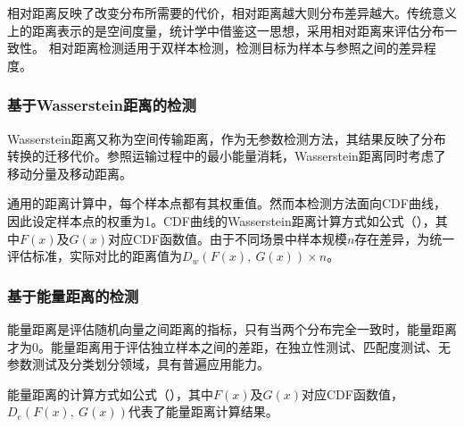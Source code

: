 相对距离反映了改变分布所需要的代价，相对距离越大则分布差异越大。传统意义上的距离表示的是空间度量，统计学中借鉴这一思想，采用相对距离来评估分布一致性。
相对距离检测适用于双样本检测，检测目标为样本与参照之间的差异程度。

\subsubsection{基于Wasserstein距离的检测}
\label{chap:analyze:statistical:distance:wasserstein}

Wasserstein距离又称为空间传输距离，作为无参数检测方法，其结果反映了分布转换的迁移代价。参照运输过程中的最小能量消耗，Wasserstein距离同时考虑了移动分量及移动距离。

通用的距离计算中，每个样本点都有其权重值。然而本检测方法面向CDF曲线，因此设定样本点的权重为1。CDF曲线的Wasserstein距离计算方式如公式（），其中$F(x)$及$G(x)$对应CDF函数值。由于不同场景中样本规模$n$存在差异，为统一评估标准，实际对比的距离值为$D_{w}(F(x),\ G(x))\times n$。

\subsubsection{基于能量距离的检测}
\label{chap:analyze:statistical:distance:energy}

能量距离是评估随机向量之间距离的指标，只有当两个分布完全一致时，能量距离才为0。能量距离用于评估独立样本之间的差距，在独立性测试、匹配度测试、无参数测试及分类划分领域，具有普遍应用能力。

能量距离的计算方式如公式（），其中$F(x)$及$G(x)$对应CDF函数值，$D_{e}(F(x),\ G(x))$代表了能量距离计算结果。

